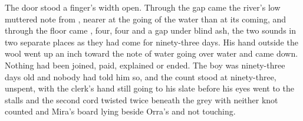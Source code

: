 The door stood a finger's width open. Through the gap came the river's low muttered note from , nearer at the going of the water than at its coming, and through the floor came , four, four and a gap under blind ash, the two sounds in two separate places as they had come for ninety-three days. His hand outside the wool went up an inch toward the note of water going over water and came down. Nothing had been joined, paid, explained or ended. The boy was ninety-three days old and nobody had told him so, and the count stood at ninety-three, unspent, with the clerk's hand still going to his slate before his eyes went to the stalls and the second cord twisted twice beneath the grey with neither knot counted and Mira's board lying beside Orra's and not touching.
